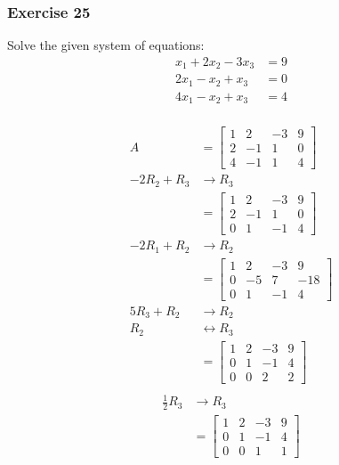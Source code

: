 \documentclass[letterpaper, 12pt]{math}
\begin{document}
\subsubsection*{Exercise 25}
Solve the given system of equations:
\begin{align*}
  x_1+2x_2-3x_3 &= 9 \\
  2x_1-x_2+x_3 &= 0 \\
  4x_1-x_2+x_3 &= 4 \\
\end{align*}
\newpage
\begin{multicols}{2}
  \begin{align*}
    A &= \begin{bmatrix}
      1 & 2 & -3 & 9 \\
      2 & -1 & 1 & 0 \\
      4 & -1 & 1 & 4
    \end{bmatrix} \\
    -2R_2+R_3 &\to R_3 \\
    &= \begin{bmatrix}
      1 & 2 & -3 & 9 \\
      2 & -1 & 1 & 0 \\
      0 & 1 & -1 & 4
    \end{bmatrix} \\
    -2R_1+R_2 &\to R_2 \\
    &= \begin{bmatrix}
      1 & 2 & -3 & 9 \\
      0 & -5 & 7 & -18 \\
      0 & 1 & -1 & 4
    \end{bmatrix} \\
    5R_3+R_2 &\to R_2 \\
    R_2 &\leftrightarrow R_3 \\
    &= \begin{bmatrix}
      1 & 2 & -3 & 9 \\
      0 & 1 & -1 & 4 \\
      0 & 0 & 2 & 2
    \end{bmatrix} \\
  \end{align*}
  \begin{align*}
    \frac{1}{2}R_3 &\to R_3 \\
    &= \begin{bmatrix}
      1 & 2 & -3 & 9 \\
      0 & 1 & -1 & 4 \\
      0 & 0 & 1 & 1
    \end{bmatrix} \\

\end{align*}
\end{multicols}
\end{document}
